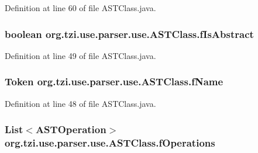 Definition at line 60 of file A\-S\-T\-Class.\-java.

\hypertarget{classorg_1_1tzi_1_1use_1_1parser_1_1use_1_1_a_s_t_class_af0ddeb5fdaf847dc54d64ed7d4bcfc5a}{
\subsubsection[{f\-Is\-Abstract}]{\setlength{\rightskip}{0pt plus 5cm}boolean org.\-tzi.\-use.\-parser.\-use.\-A\-S\-T\-Class.\-f\-Is\-Abstract\hspace{0.3cm}{\ttfamily [protected]}}}\label{classorg_1_1tzi_1_1use_1_1parser_1_1use_1_1_a_s_t_class_af0ddeb5fdaf847dc54d64ed7d4bcfc5a}


Definition at line 49 of file A\-S\-T\-Class.\-java.

\hypertarget{classorg_1_1tzi_1_1use_1_1parser_1_1use_1_1_a_s_t_class_a0c2533e2c8c8e5426c0a87dad0cf850c}{
\subsubsection[{f\-Name}]{\setlength{\rightskip}{0pt plus 5cm}Token org.\-tzi.\-use.\-parser.\-use.\-A\-S\-T\-Class.\-f\-Name\hspace{0.3cm}{\ttfamily [protected]}}}\label{classorg_1_1tzi_1_1use_1_1parser_1_1use_1_1_a_s_t_class_a0c2533e2c8c8e5426c0a87dad0cf850c}


Definition at line 48 of file A\-S\-T\-Class.\-java.

\hypertarget{classorg_1_1tzi_1_1use_1_1parser_1_1use_1_1_a_s_t_class_aa91a9797761f3f7260d8d632bf167ae0}{
\subsubsection[{f\-Operations}]{\setlength{\rightskip}{0pt plus 5cm}List$<${\bf A\-S\-T\-Operation}$>$ org.\-tzi.\-use.\-parser.\-use.\-A\-S\-T\-Class.\-f\-Operations\hspace{0.3cm}{\ttfamily [protected]}}}\label{classorg_1_1tzi_1_1use_1_1parser_1_1use_1_1_a_s_t_class_aa91a9797761f3f7260d8d632bf167ae0}


